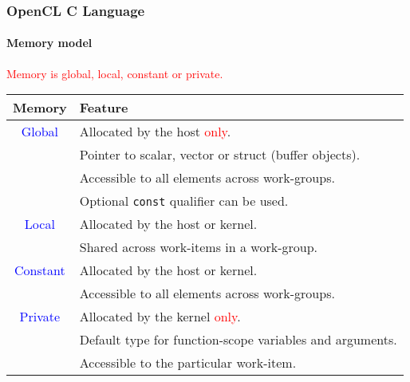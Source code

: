 \documentclass{beamer}
\newcommand{\code}[1]{\lstinline[basicstyle=\sffamily]{#1}}
\newcommand{\tablefont}{\fontsize{8}{13}\selectfont}
\begin{document}
\begin{frame}
\frametitle{OpenCL C Language}
\framesubtitle{Memory model}

  \begin{center}
\textcolor{red}{Memory is global, local, constant or private.}
  \end{center}
  
  \tablefont

  \begin{center}
  \begin{tabular}{|c|l|}
  \hline
  Memory & Feature \\
  \hline
  \textcolor{blue}{Global} & Allocated by the host \textcolor{red}{only}. \\
         & Pointer to scalar, vector or struct (buffer objects). \\
         & Accessible to all elements across work-groups. \\
         & Optional \code{const} qualifier can be used. \\
  \hline
  \textcolor{blue}{Local} & Allocated by the host or kernel. \\
         & Shared across work-items in a work-group. \\
  \hline
  \textcolor{blue}{Constant} & Allocated by the host or kernel. \\
         & Accessible to all elements across work-groups. \\
  \hline
  \textcolor{blue}{Private} & Allocated by the kernel \textcolor{red}{only}. \\
         & Default type for function-scope variables and arguments. \\
         & Accessible to the particular work-item. \\
  \hline
  \end{tabular}
  \end{center}

  \normalsize

\end{frame}
\end{document}
